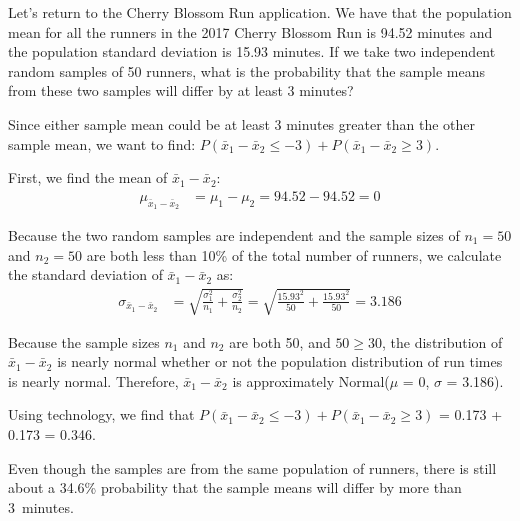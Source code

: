 \begin{examplewrap}
\begin{nexample}{
  Let's return to the Cherry Blossom Run application.
  We have that the population mean for all the runners in the 2017 Cherry Blossom Run is 94.52 minutes and the population standard deviation is 15.93 minutes.  If we take two independent random samples of 50 runners, what is the probability that the sample means from these two samples will differ by at least 3 minutes?}

Since either sample mean could be at least 3 minutes greater than the other sample mean, we want to find:
$P(\bar{x}_1 - \bar{x}_2 \le -3) + P(\bar{x}_1 - \bar{x}_2 \ge 3)$.

First, we find the mean of  $\bar{x}_1-\bar{x}_2$: 
\begin{align*}
\mu_{\bar{x}_1-\bar{x}_2} &= \mu_1-\mu_2 = 94.52-94.52 = 0 
\end{align*}

Because the two random samples are independent and the sample sizes of $n_1=50$ and $n_2=50$ are both less than 10\% of the total number of runners, we calculate the standard deviation of $\bar{x}_1-\bar{x}_2$ as:  
\begin{align*}
\sigma_{\bar{x}_1-\bar{x}_2}
  &= \sqrt{\frac{\sigma_1^2}{n_1} + \frac{\sigma_2^2}{n_2}}
  = \sqrt{\frac{15.93^2}{50} + \frac{15.93^2}{50}}= 3.186
\end{align*}

Because the sample sizes $n_1$ and $n_2$ are both 50, and $50 \ge 30$, the distribution of $\bar{x}_1-\bar{x}_2$ is nearly normal whether or not the population distribution of run times is nearly normal.  Therefore, $\bar{x}_1-\bar{x}_2$ is approximately Normal($\mu$ = 0, $\sigma$ = 3.186). 

Using technology, we find that $P(\bar{x}_1 - \bar{x}_2 \le -3) + P(\bar{x}_1 - \bar{x}_2 \ge 3)$ = 0.173 + 0.173 = 0.346.     
\begin{center}
\end{center}
Even though the samples are from the same population of runners,
there is still about a 34.6\% probability that the sample means will differ by more than 3~minutes.
\end{nexample}
\end{examplewrap}


